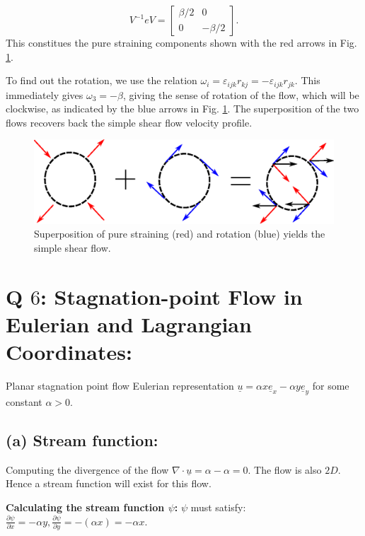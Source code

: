 \documentclass{article}
\begin{document}
\begin{equation}
 V^{-1}e V = \begin{bmatrix}
              \beta/2 & 0\\
              0 & -\beta/2
             \end{bmatrix}.
\end{equation}
This constitues the pure straining components shown with the red arrows in Fig. \ref{fig:shearflow_decomp}. 

To find out the rotation, we use the relation $\omega_{i} = \varepsilon_{ijk} r_{kj} = - \varepsilon_{ijk} r_{jk}$.
This immediately gives $\omega_{3} = -\beta$, giving the sense of rotation of the flow, which will be clockwise, as indicated by the blue arrows in Fig. \ref{fig:shearflow_decomp}. The superposition of the two flows recovers back the simple shear flow velocity profile. 
\begin{figure}[H]
    \centering
    \includegraphics[scale = 0.8]{Figs/shearflow_decomp.eps}
    \caption{Superposition of pure straining (red) and rotation (blue) yields the simple shear flow.}
    \label{fig:shearflow_decomp}
\end{figure}
\section{Q $6$: Stagnation-point Flow in Eulerian and Lagrangian Coordinates:}
Planar stagnation point flow Eulerian representation $\underline{u} = \alpha x \underline{e}_{x} - \alpha y \underline{e}_{y}$ for some constant $\alpha > 0$.
\subsection*{(a) Stream function:} 
Computing the divergence of the flow $\nabla\cdot \underline{u} = \alpha - \alpha = 0$. The flow is also $2D$. Hence a stream function will exist for this flow. 

\textbf{Calculating the stream function $\psi$:}
$\psi$ must satisfy: $\frac{\partial \psi}{\partial x} = - \alpha y, \frac{\partial \psi}{\partial y} = -(\alpha x) = - \alpha x$. 
\end{document}
